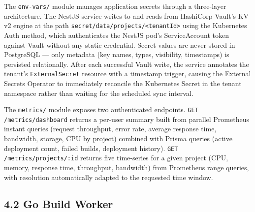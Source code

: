 The \texttt{env-vars/} module manages application secrets through a three-layer architecture. The NestJS service writes to and reads from HashiCorp Vault's KV v2 engine at the path \texttt{secret/data/projects/<tenantId>} using the Kubernetes Auth method, which authenticates the NestJS pod's ServiceAccount token against Vault without any static credential. Secret values are never stored in PostgreSQL — only metadata (key names, types, visibility, timestamps) is persisted relationally. After each successful Vault write, the service annotates the tenant's \texttt{ExternalSecret} resource with a timestamp trigger, causing the External Secrets Operator to immediately reconcile the Kubernetes Secret in the tenant namespace rather than waiting for the scheduled sync interval.

The \texttt{metrics/} module exposes two authenticated endpoints. \texttt{GET /metrics/dashboard} returns a per-user summary built from parallel Prometheus instant queries (request throughput, error rate, average response time, bandwidth, storage, CPU by project) combined with Prisma queries (active deployment count, failed builds, deployment history). \texttt{GET /metrics/projects/:id} returns five time-series for a given project (CPU, memory, response time, throughput, bandwidth) from Prometheus range queries, with resolution automatically adapted to the requested time window.

\subsection*{4.2 Go Build Worker}

